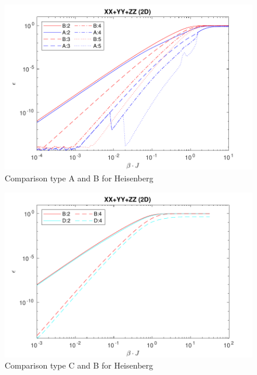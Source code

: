 \begin{figure}[H]
    \center
    \includegraphics[width=\textwidth]{Figuren/benchmarking/heis_XXX.pdf}
    \caption{Comparison type A and B for Heisenberg}
    \label{fig:benchmark:Heisenberg}
\end{figure}

\begin{figure}[H]
    \center
    \includegraphics[width=\textwidth]{Figuren/benchmarking/type5/heis.pdf}
    \caption{Comparison type C and B for Heisenberg}
    \label{bench:type5heis}
\end{figure}

